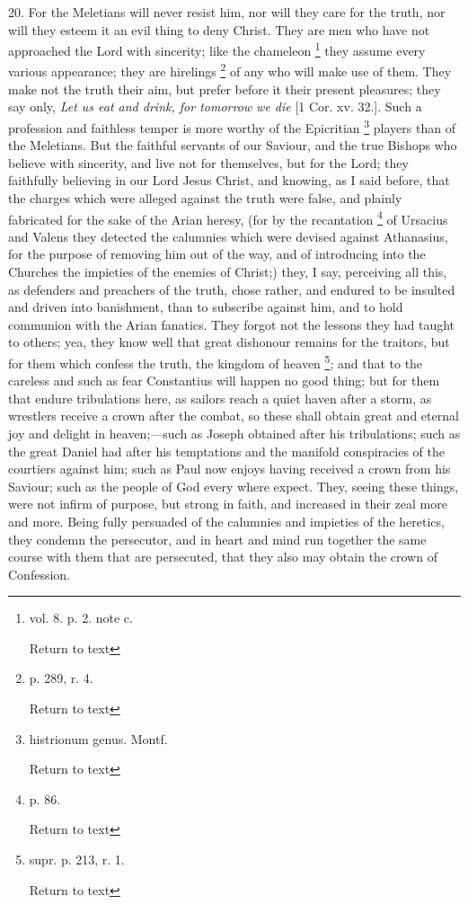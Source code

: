 20. For the Meletians will never resist him, nor
will they care for the truth, nor will they esteem it an evil thing to
deny Christ. They are men who have not approached the Lord with
sincerity; like the chameleon \footnote{vol. 8. p. 2. note c.

Return to text} they assume every various
appearance; they are hirelings \footnote{p. 289, r. 4.

Return to text} of any who will make use of
them. They make not the truth their aim, but prefer before it their
present pleasures; they say only, \emph{Let us eat and drink, for
tomorrow we die} [1 Cor. xv. 32.]. Such a profession and faithless
temper is more worthy of the Epicritian \footnote{histrionum genus.
Montf.

Return to text} players than of the
Meletians. But the faithful servants of our Saviour, and the true
Bishops who believe with sincerity, and live not for themselves, but
for the Lord; they faithfully believing in our Lord Jesus Christ, and
knowing, as I said before, that the charges which were alleged against
the truth were false, and plainly fabricated for the sake of the Arian
heresy, (for by the recantation \footnote{p. 86.

Return to text} of Ursacius and Valens they
detected the calumnies which were devised against Athanasius, for the
purpose of removing him out of the way, and of introducing into the
Churches the impieties of the enemies of Christ;) they, I say,
perceiving all this, as defenders and preachers of the truth, chose
rather, and endured to be insulted and driven into banishment, than to
subscribe against him, and to hold communion with the Arian fanatics.
They forgot not the lessons they had taught to others; yea, they know
well that great dishonour remains for the traitors, but for them which
confess the truth, the kingdom of heaven \footnote{supr. p. 213, r. 1.

Return to text}; and that to the
careless and such as fear Constantius will happen no good thing; but
for them that endure tribulations here, as sailors reach a quiet haven
after a storm, as wrestlers receive a crown after the combat, so these
shall obtain great and eternal joy and delight in heaven;—such as
Joseph obtained after his tribulations; such as the great Daniel had
after his temptations and the manifold conspiracies of the courtiers
against him; such as Paul now enjoys having received a crown from his
Saviour; such as the people of God every where expect. They, seeing
these things, were not infirm of purpose, but strong in faith, and
increased in their zeal more and more. Being fully persuaded of the
calumnies and impieties of the heretics, they condemn the persecutor,
and in heart and mind run together the same course with them that are
persecuted, that they also may obtain the crown of Confession.

